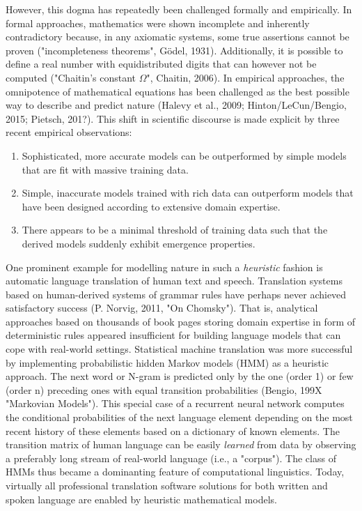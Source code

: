 \documentclass[authoryear,review,3p]{elsarticle}
\begin{document}
However, this dogma has repeatedly been challenged formally
and empirically.
%
In formal approaches,
mathematics were shown incomplete and inherently contradictory because,
in any axiomatic systems, some true assertions cannot be proven
("incompleteness theorems", G\"odel, 1931).
Additionally,
it is possible to define a real number with equidistributed
digits that can however not be computed
("Chaitin's constant $\Omega$", Chaitin, 2006).
%
In empirical approaches,
the omnipotence of mathematical equations has been challenged
as the
best possible way to describe and predict nature
(Halevy et al., 2009; Hinton/LeCun/Bengio, 2015; Pietsch, 201?).
%
This shift in scientific discourse is made explicit by
three recent empirical observations:
\begin{enumerate}
  \item Sophisticated, more accurate models can be outperformed by
  simple models that are fit with massive training data.
  \item Simple, inaccurate models trained with rich data can outperform
  models that have been designed according to
  extensive domain expertise.
  \item There appears to be a minimal threshold of training data
  such that the derived models suddenly exhibit emergence properties.
\end{enumerate}

One prominent example for modelling nature in such a \textit{heuristic} fashion is
automatic language translation of human text and speech.
Translation systems based on 
human-derived systems of grammar rules have perhaps never achieved
satisfactory success (P. Norvig, 2011, "On Chomsky").
That is, analytical approaches based on
thousands of book pages storing domain expertise in form of
deterministic rules appeared insufficient for building
language models that can cope with real-world settings.
%
Statistical machine translation was more successful
by implementing probabilistic hidden Markov models (HMM)
as a heuristic approach.
%
The next word or N-gram is predicted
only by the one (order 1) or few (order n) preceding ones
with equal transition probabilities (Bengio, 199X "Markovian Models").
This special case of a recurrent neural network
computes the conditional probabilities of the next language element
depending on the most recent history of these elements
based on a dictionary of known elements.
The transition matrix of human language can be easily \textit{learned}
from data by observing a preferably long stream of
real-world language (i.e., a "corpus").
%
The class of HMMs
thus became a dominanting feature
of computational linguistics.
%
Today, virtually all professional translation software solutions
for both written and spoken language
are enabled by heuristic mathematical models.
\end{document}
